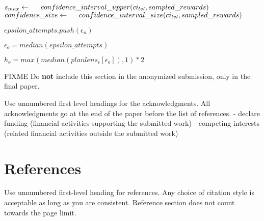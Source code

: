 \documentclass{article}
\begin{document}
\begin{algorithm}[h]
{{                $s_{max} \gets\hspace{0.5cm}    confidence\_interval\_upper(ci_{lvl}, sampled\_rewards)$
                $confidence\_size \gets
                \hspace{0.5cm}    confidence\_interval\_size(ci_{lvl} , sampled\_rewards)$
            }
            
            
            $epsilon\_attempts.push(\epsilon_n)$
        }
        $\epsilon_o = median(epsilon\_attempts)$

        $h_o = max(median(planlens_\epsilon[\epsilon_o]), 1) * 2$

    \end{algorithm}




    \begin{ack}
        FIXME
        Do {\bf not} include this section in the anonymized submission, only in the final paper.
        
        Use unnumbered first level headings for the acknowledgments.
        All acknowledgments go at the end of the paper before the list of references.
        - declare funding (financial activities supporting the submitted work)
        - competing interests (related financial activities outside the submitted work)
    \end{ack}


    \section*{References}
        Use unnumbered first-level heading for references.
        Any choice of citation style is acceptable as long as you are consistent.
        Reference section does not count towards the page limit.
    \medskip
\end{document}
